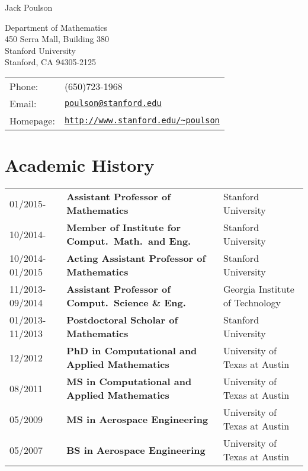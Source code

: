 \documentclass[letterpaper]{article}
\def\name{Jack Poulson}
\begin{document}
{\huge \name}

\vspace{0.25in}

\begin{minipage}{0.45\linewidth}
  Department of Mathematics \\
  450 Serra Mall, Building 380 \\
  Stanford University \\
  Stanford, CA 94305-2125
\end{minipage}
\begin{minipage}{0.45\linewidth}
  \begin{tabular}{ll}
    Phone:&(650)723-1968 \\
    Email:&\href{mailto:poulson@stanford.edu}{\tt poulson@stanford.edu} \\
    Homepage: & \href{http://www.stanford.edu/~poulson}{\tt http://www.stanford.edu/\textasciitilde poulson} \\
  \end{tabular}
\end{minipage}

\section*{Academic History}

\begin{tabular}{lll}
01/2015-        & {\bf Assistant Professor of Mathematics}               & Stanford University \\
10/2014-        & {\bf Member of Institute for Comput.\ Math.\ and Eng.} & Stanford University \\
10/2014-01/2015 & {\bf Acting Assistant Professor of Mathematics}        & Stanford University \\
11/2013-09/2014 & {\bf Assistant Professor of Comput.\ Science \& Eng. } & Georgia Institute of Technology \\
01/2013-11/2013 & {\bf Postdoctoral Scholar of Mathematics}              & Stanford University \\
12/2012         & {\bf PhD in Computational and Applied Mathematics}     & University of Texas at Austin \\
08/2011         & {\bf MS in Computational and Applied Mathematics}      & University of Texas at Austin \\
05/2009         & {\bf MS in Aerospace Engineering}                      & University of Texas at Austin \\
05/2007         & {\bf BS in Aerospace Engineering}                      & University of Texas at Austin \\
\end{tabular}
\end{document}
